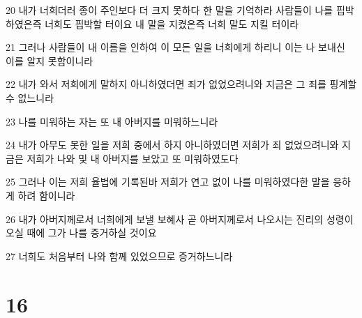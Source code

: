 \par 20 내가 너희더러 종이 주인보다 더 크지 못하다 한 말을 기억하라 사람들이 나를 핍박하였은즉 너희도 핍박할 터이요 내 말을 지켰은즉 너희 말도 지킬 터이라
\par 21 그러나 사람들이 내 이름을 인하여 이 모든 일을 너희에게 하리니 이는 나 보내신 이를 알지 못함이니라
\par 22 내가 와서 저희에게 말하지 아니하였더면 죄가 없었으려니와 지금은 그 죄를 핑계할 수 없느니라
\par 23 나를 미워하는 자는 또 내 아버지를 미워하느니라
\par 24 내가 아무도 못한 일을 저희 중에서 하지 아니하였더면 저희가 죄 없었으려니와 지금은 저희가 나와 및 내 아버지를 보았고 또 미워하였도다
\par 25 그러나 이는 저희 율법에 기록된바 저희가 연고 없이 나를 미워하였다한 말을 응하게 하려 함이니라
\par 26 내가 아버지께로서 너희에게 보낼 보혜사 곧 아버지께로서 나오시는 진리의 성령이 오실 때에 그가 나를 증거하실 것이요
\par 27 너희도 처음부터 나와 함께 있었으므로 증거하느니라

\chapter{16}

